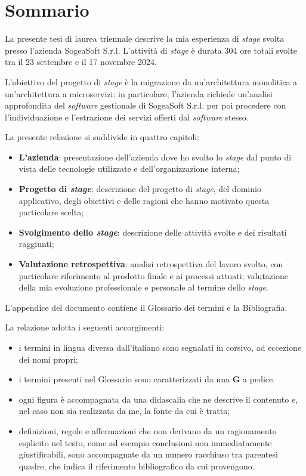 \chapter*{Sommario}
\vspace{0.5cm}
\noindent La presente tesi di laurea triennale descrive la mia esperienza di \textit{stage} svolta presso l'azienda SogeaSoft S.r.l. L'attività di \textit{stage} è durata 304 ore totali svolte tra il 23 settembre e il 17 novembre 2024. 


\noindent L'obiettivo del progetto di \textit{stage} è la migrazione da un'architettura monolitica a un'architettura a microservizi: in particolare, l'azienda richiede un'analisi approfondita del \textit{software} gestionale di SogeaSoft S.r.l. per poi procedere con l'individuazione e l'estrazione dei servizi offerti dal \textit{software} stesso. 

\noindent La presente relazione si suddivide in quattro capitoli:
\begin{itemize}
    \item \textbf{L'azienda}: presentazione dell'azienda dove ho svolto lo \textit{stage} dal punto di vista delle tecnologie utilizzate e dell'organizzazione interna;
    \item \textbf{Progetto di \textit{stage}}: descrizione del progetto di \textit{stage}, del dominio applicativo, degli obiettivi e delle ragioni che hanno motivato questa particolare scelta;
    \item \textbf{Svolgimento dello \textit{stage}}: descrizione delle attività svolte e dei risultati raggiunti;
    \item \textbf{Valutazione retrospettiva}: analisi retrospettiva del lavoro svolto, con particolare riferimento al prodotto finale e ai processi attuati; valutazione della mia evoluzione professionale e personale al termine dello \textit{stage}.
   \end{itemize}

\noindent L'appendice del documento contiene il Glossario dei termini e la Bibliografia. 

\noindent La relazione adotta i seguenti accorgimenti:
\begin{itemize}
    \item i termini in lingua diversa dall'italiano sono segnalati in corsivo, ad eccezione dei nomi propri;
    \item i termini presenti nel Glossario sono caratterizzati da una \textbf{G} a pedice. 
    \item ogni figura è accompagnata da una didascalia che ne descrive il contenuto e, nel caso non sia realizzata da me, la fonte da cui è tratta;
    \item definizioni, regole e affermazioni che non derivano da un ragionamento esplicito nel testo, come ad esempio conclusioni non immediatamente giustificabili, sono accompagnate da un numero racchiuso tra parentesi quadre, che indica il riferimento bibliografico da cui provengono. 
\end{itemize}

\clearpage